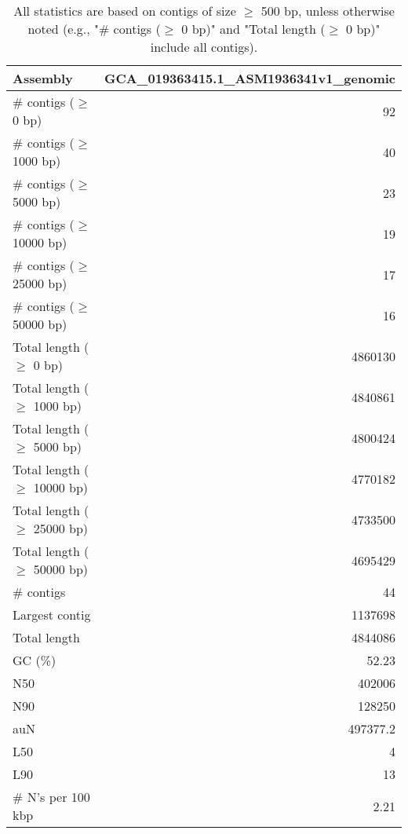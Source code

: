\documentclass[12pt,a4paper]{article}
\begin{document}
\begin{table}[ht]
\begin{center}
\caption{All statistics are based on contigs of size $\geq$ 500 bp, unless otherwise noted (e.g., "\# contigs ($\geq$ 0 bp)" and "Total length ($\geq$ 0 bp)" include all contigs).}
\begin{tabular}{|l*{1}{|r}|}
\hline
Assembly & GCA\_019363415.1\_ASM1936341v1\_genomic \\ \hline
\# contigs ($\geq$ 0 bp) & 92 \\ \hline
\# contigs ($\geq$ 1000 bp) & 40 \\ \hline
\# contigs ($\geq$ 5000 bp) & 23 \\ \hline
\# contigs ($\geq$ 10000 bp) & 19 \\ \hline
\# contigs ($\geq$ 25000 bp) & 17 \\ \hline
\# contigs ($\geq$ 50000 bp) & 16 \\ \hline
Total length ($\geq$ 0 bp) & 4860130 \\ \hline
Total length ($\geq$ 1000 bp) & 4840861 \\ \hline
Total length ($\geq$ 5000 bp) & 4800424 \\ \hline
Total length ($\geq$ 10000 bp) & 4770182 \\ \hline
Total length ($\geq$ 25000 bp) & 4733500 \\ \hline
Total length ($\geq$ 50000 bp) & 4695429 \\ \hline
\# contigs & 44 \\ \hline
Largest contig & 1137698 \\ \hline
Total length & 4844086 \\ \hline
GC (\%) & 52.23 \\ \hline
N50 & 402006 \\ \hline
N90 & 128250 \\ \hline
auN & 497377.2 \\ \hline
L50 & 4 \\ \hline
L90 & 13 \\ \hline
\# N's per 100 kbp & 2.21 \\ \hline
\end{tabular}
\end{center}
\end{table}
\end{document}

